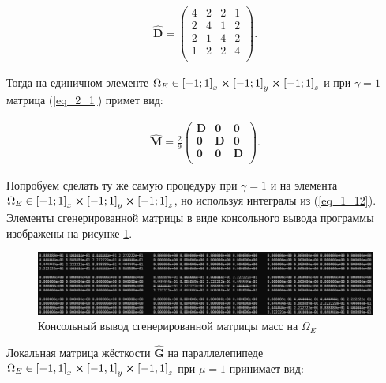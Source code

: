 \begin{equation*}
	\begin{gathered}
		\hat{\textbf{D}} =
		\begin{pmatrix}
			4 & 2 & 2 & 1\\
			2 & 4 & 1 & 2\\
			2 & 1 & 4 & 2\\
			1 & 2 & 2 & 4\\
		\end{pmatrix}.
	\end{gathered}
\end{equation*}

Тогда на единичном элементе $\Omega_E \in \left[-1; 1\right]_x \cross \left[-1; 1\right]_y \cross \left[-1; 1\right]_z$ и при $\gamma = 1$ матрица (\ref{eq_2_1}) примет вид:


\begin{equation*}
	\begin{gathered}
		\hat{\textbf{M}} = \frac{2}{9} 
		\begin{pmatrix} 
			\textbf{D} & \textbf{0} & \textbf{0}\\
			\textbf{0} & \textbf{D} & \textbf{0}\\
			\textbf{0} & \textbf{0} & \textbf{D}\\
		\end{pmatrix}.
	\end{gathered}
\end{equation*}

Попробуем сделать ту же самую процедуру при $\gamma = 1$ и на элемента $\Omega_E \in \left[-1; 1\right]_x \cross \left[-1; 1\right]_y \cross \left[-1; 1\right]_z$, но используя интегралы из (\ref{eq_1_12}). Элементы сгенерированной матрицы в виде консольного вывода программы изображены на рисунке \ref{fig:GeneratedMatrixMass}.

\begin{figure}
	\centering
	\vspace*{0.7cm}
	\includegraphics[width=1.0\linewidth]{images/M.png}
	\caption{Консольный вывод сгенерированной матрицы масс на $\Omega_E$}
	\label{fig:GeneratedMatrixMass}
\end{figure}

Локальная матрица жёсткости $\hat{\textbf{G}}$ на параллелепипеде $\Omega_E \in \left[-1, 1\right]_x \cross \left[-1, 1\right]_y \cross \left[-1, 1\right]_z$ при $\overline{\mu} = 1$ принимает вид:

